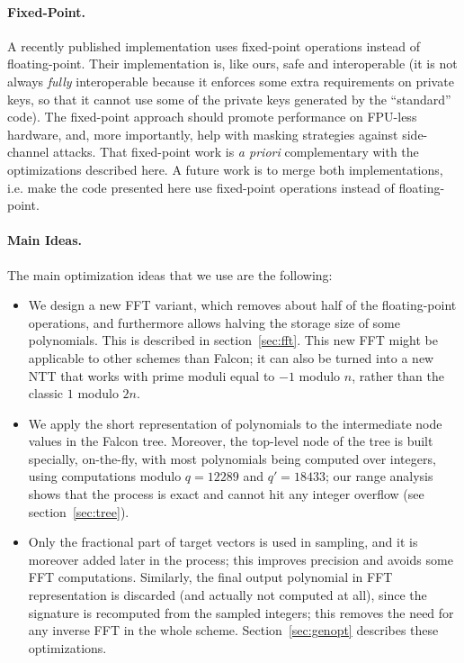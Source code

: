 \documentclass{llncs}
\begin{document}
\paragraph{Fixed-Point.}
A recently published implementation uses fixed-point operations instead
of floating-point\cite{AlmFouLacPre2026}. Their implementation is, like
ours, safe and interoperable (it is not always \emph{fully}
interoperable because it enforces some extra requirements on private
keys, so that it cannot use some of the private keys generated by the
``standard'' code). The fixed-point approach should promote performance
on FPU-less hardware, and, more importantly, help with masking
strategies against side-channel attacks. That fixed-point work is
\emph{a priori} complementary with the optimizations described here. A
future work is to merge both implementations, i.e. make the code
presented here use fixed-point operations instead of floating-point.

\paragraph{Main Ideas.}
The main optimization ideas that we use are the following:
\begin{itemize}

    \item We design a new FFT variant, which removes about half of the
    floating-point operations, and furthermore allows halving the
    storage size of some polynomials. This is described in
    section~\ref{sec:fft}. This new FFT might be applicable to other
    schemes than Falcon; it can also be turned into a new NTT that works
    with prime moduli equal to $-1$ modulo $n$, rather than the classic
    $1$ modulo $2n$.

    \item We apply the short representation of polynomials to the
    intermediate node values in the Falcon tree. Moreover, the top-level
    node of the tree is built specially, on-the-fly, with most polynomials
    being computed over integers, using computations modulo $q = 12289$
    and $q' = 18433$; our range analysis shows that the process is
    exact and cannot hit any integer overflow (see section~\ref{sec:tree}).

    \item Only the fractional part of target vectors is used in sampling,
    and it is moreover added later in the process; this improves precision
    and avoids some FFT computations. Similarly, the final output polynomial
    in FFT representation is discarded (and actually not computed at all),
    since the signature is recomputed from the sampled integers; this
    removes the need for any inverse FFT in the whole scheme.
    Section~\ref{sec:genopt} describes these optimizations.

\end{itemize}
\end{document}
